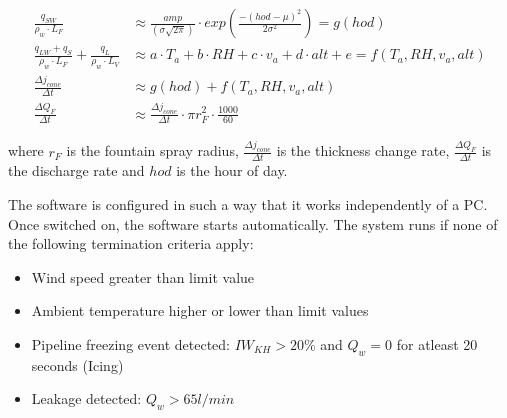 \documentclass[tc, manuscript]{copernicus}
\begin{document}
\begin{subequations}
	\begin{align}
		\label{eqn:sun}
  \frac{q_{SW}}{\rho_w \cdot L_F} & \approx \frac{amp}{(\sigma \sqrt{2\pi})} \cdot
  exp\left(\frac{-(hod-\mu)^2}{2\sigma^2}\right) = g(hod)  \\
		\label{eqn:T}
   \frac{q_{LW} + q_{S}}{\rho_w \cdot L_F} + \frac{q_L}{\rho_w \cdot L_V} & \approx a \cdot T_a + b \cdot RH + c \cdot v_a +
  d \cdot alt + e = f(T_a, RH, v_a, alt) \\
		\label{eqn:auto}
  \frac{\Delta j_{cone}}{\Delta t} & \approx g(hod) + f(T_a, RH, v_a, alt)\\
		\label{eqn:auto}
  \frac{\Delta Q_{F}}{\Delta t} & \approx \frac{\Delta j_{cone}}{\Delta t} \cdot \pi r_{F}^2 \cdot
  \frac{1000}{60}
	\end{align}
\end{subequations}

where $r_F$ is the fountain spray radius, $\frac{\Delta j_{cone}}{\Delta t}$ is the thickness change rate,
$\frac{\Delta Q_{F}}{\Delta t}$ is the discharge rate and $hod$ is the hour of day.


The software is configured in such a way that it works independently of a PC. Once switched on, the software
starts automatically. The system runs if none of the following termination criteria apply:

\begin{itemize}
\item Wind speed greater than limit value
\item Ambient temperature higher or lower than limit values
\item Pipeline freezing event detected: $IW_{KH} > 20 \%$ and $Q_w = 0$ for atleast 20 seconds (Icing)
\item Leakage detected: $Q_w > 65 l/min$
\end{itemize}
\end{document}
